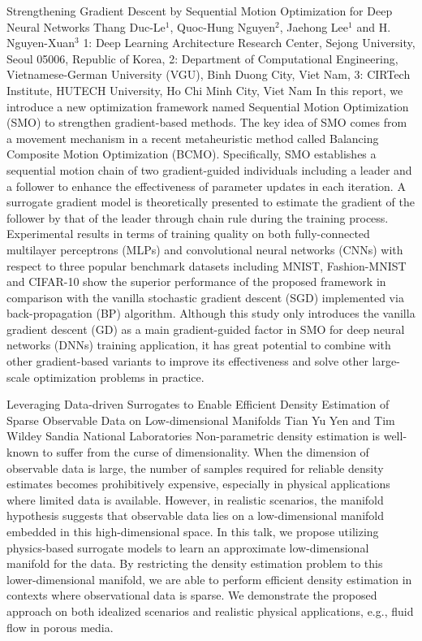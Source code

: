 \begin{addmargin}[2em]{0em}
\vspace{1.5ex}
\abs
{Strengthening Gradient Descent by Sequential Motion Optimization for Deep Neural Networks}
{Thang Duc-Le$^{1}$, Quoc-Hung Nguyen$^{2}$, Jaehong Lee$^{1}$ and H. Nguyen-Xuan$^{3}$}
{1: Deep Learning Architecture Research Center, Sejong University, Seoul 05006, Republic of Korea, 2: Department of Computational Engineering, Vietnamese-German University (VGU), Binh Duong City, Viet Nam, 3: CIRTech Institute, HUTECH University, Ho Chi Minh City, Viet Nam}
{In this report, we introduce a new optimization framework named Sequential Motion Optimization (SMO) to strengthen gradient-based methods. The key idea of SMO comes from a movement mechanism in a recent metaheuristic method called Balancing Composite Motion Optimization (BCMO). Specifically, SMO establishes a sequential motion chain of two gradient-guided individuals including a leader and a follower to enhance the effectiveness of parameter updates in each iteration. A surrogate gradient model is theoretically presented to estimate the gradient of the follower by that of the leader through chain rule during the training process. Experimental results in terms of training quality on both fully-connected multilayer perceptrons (MLPs) and convolutional neural networks (CNNs) with respect to three popular benchmark datasets including MNIST, Fashion-MNIST and CIFAR-10 show the superior performance of the proposed framework in comparison with the vanilla stochastic gradient descent (SGD) implemented via back-propagation (BP) algorithm. Although this study only introduces the vanilla gradient descent (GD) as a main gradient-guided factor in SMO for deep neural networks (DNNs) training application, it has great potential to combine with other gradient-based variants to improve its effectiveness and solve other large-scale optimization problems in practice.}


\vspace{1.5ex}
\abs
{Leveraging Data-driven Surrogates to Enable Efficient Density Estimation of Sparse Observable Data on Low-dimensional Manifolds}
{Tian Yu Yen and Tim Wildey}
{Sandia National Laboratories}
{Non-parametric density estimation is well-known to suffer from the curse of dimensionality. When the dimension of observable data is large, the number of samples required for reliable density estimates becomes prohibitively expensive, especially in physical applications where limited data is available. However, in realistic scenarios, the manifold hypothesis suggests that observable data lies on a low-dimensional manifold embedded in this high-dimensional space. In this talk, we propose utilizing physics-based surrogate models to learn an approximate low-dimensional manifold for the data. By restricting the density estimation problem to this lower-dimensional manifold, we are able to perform efficient density estimation in contexts where observational data is sparse. We demonstrate the proposed approach on both idealized scenarios and realistic physical applications, e.g., fluid flow in porous media.}



\end{addmargin}
